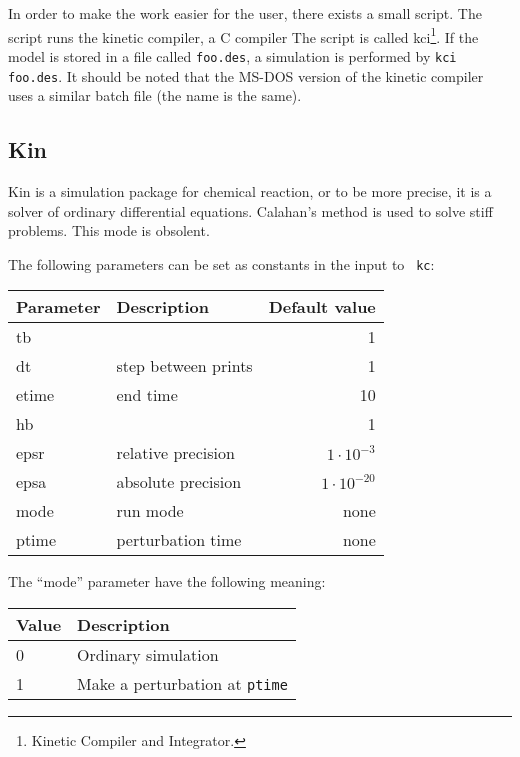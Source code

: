 In order to make the work easier for the user, there exists a small
script. The script runs the kinetic compiler, a C compiler \etc The
script is called kci\footnote{Kinetic Compiler and Integrator.}. If
the model is stored in a file called {\tt foo.des}, a simulation is
performed by {\tt kci foo.des}. It should be noted that the MS-DOS
version of the kinetic compiler uses a similar batch file (the name is
the same).

\subsection{Kin}
\label{KCMAN:CodeKin}
Kin is a simulation package for chemical reaction, or to be more
precise, it is a solver of ordinary differential equations. 
Calahan's method is used to solve stiff problems. This mode is
obsolent.

The following parameters can be set as constants in the input to {\tt
  kc}:

\begin{center}
\begin{tabular}{llr}
\hline
Parameter & Description & Default value \\ \hline
tb        &             & 1  \\
dt        & step between prints   & 1 \\
etime     & end time    & 10 \\
hb        &             & 1 \\
epsr      & relative precision & $1 \cdot 10^{-3}$ \\
epsa      & absolute precision & $1 \cdot 10^{-20}$ \\ 
mode      & run mode & none \\ 
ptime     & perturbation time & none \\ \hline
\end{tabular}
\end{center}

The ``mode'' parameter have the following meaning:

\begin{center}
\begin{tabular}{ll}
\hline
Value & Description \\ \hline
0     & Ordinary simulation \\
1     & Make a perturbation at {\tt ptime} \\ \hline
\end{tabular}
\end{center}

